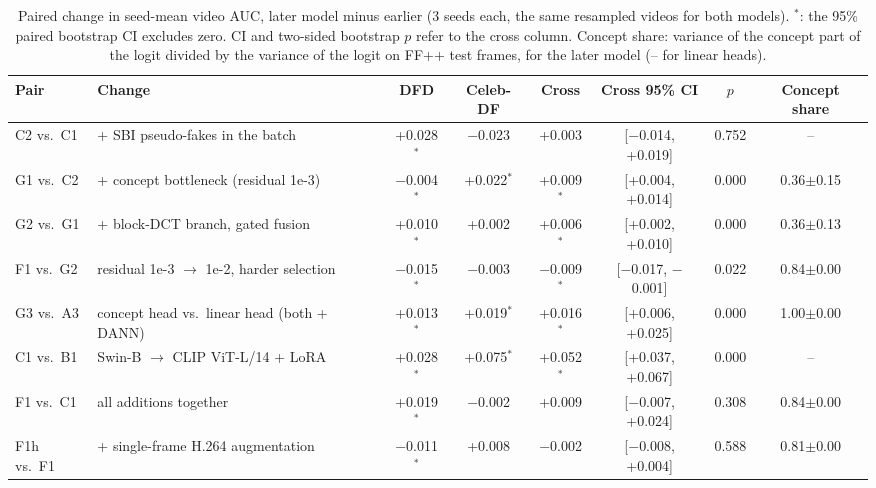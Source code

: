 \begin{table}[t]
\centering
\footnotesize
\caption{Paired change in seed-mean video AUC, later model minus earlier (3 seeds each, the same resampled videos for both models). $^{*}$: the 95\% paired bootstrap CI excludes zero. CI and two-sided bootstrap $p$ refer to the cross column. Concept share: variance of the concept part of the logit divided by the variance of the logit on FF++ test frames, for the later model (-- for linear heads).}
\label{tab:ablation}
\begin{tabular}{llcccccc}
\toprule
Pair & Change & DFD & Celeb-DF & Cross & Cross 95\% CI & $p$ & Concept share \\
\midrule
C2 vs.\ C1 & + SBI pseudo-fakes in the batch & +0.028$^{*}$ & $-$0.023 & +0.003 & [$-$0.014, +0.019] & 0.752 & -- \\
G1 vs.\ C2 & + concept bottleneck (residual 1e-3) & $-$0.004$^{*}$ & +0.022$^{*}$ & +0.009$^{*}$ & [+0.004, +0.014] & 0.000 & 0.36$\pm$0.15 \\
G2 vs.\ G1 & + block-DCT branch, gated fusion & +0.010$^{*}$ & +0.002 & +0.006$^{*}$ & [+0.002, +0.010] & 0.000 & 0.36$\pm$0.13 \\
F1 vs.\ G2 & residual 1e-3 $\to$ 1e-2, harder selection & $-$0.015$^{*}$ & $-$0.003 & $-$0.009$^{*}$ & [$-$0.017, $-$0.001] & 0.022 & 0.84$\pm$0.00 \\
G3 vs.\ A3 & concept head vs.\ linear head (both + DANN) & +0.013$^{*}$ & +0.019$^{*}$ & +0.016$^{*}$ & [+0.006, +0.025] & 0.000 & 1.00$\pm$0.00 \\
\midrule
C1 vs.\ B1 & Swin-B $\to$ CLIP ViT-L/14 + LoRA & +0.028$^{*}$ & +0.075$^{*}$ & +0.052$^{*}$ & [+0.037, +0.067] & 0.000 & -- \\
F1 vs.\ C1 & all additions together & +0.019$^{*}$ & $-$0.002 & +0.009 & [$-$0.007, +0.024] & 0.308 & 0.84$\pm$0.00 \\
F1h vs.\ F1 & + single-frame H.264 augmentation & $-$0.011$^{*}$ & +0.008 & $-$0.002 & [$-$0.008, +0.004] & 0.588 & 0.81$\pm$0.00 \\
\bottomrule
\end{tabular}
\end{table}
